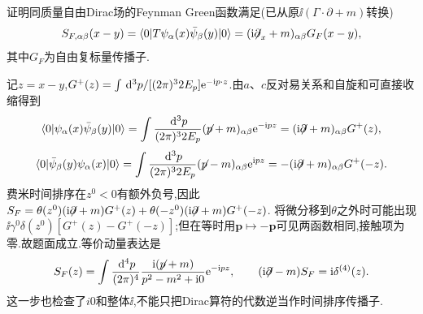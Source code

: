 \begin{exercise}
证明同质量自由Dirac场的Feynman Green函数满足(已从原$\ii(\Gamma\cdot\partial+m)$转换)
\[
 S_{F,\alpha\beta}(x-y)=\langle 0\rvert T\psi_\alpha(x)\bar\psi_\beta(y)\lvert 0\rangle
 =(\mathrm i\mathord{\not\mathrel{\partial}}_x+m)_{\alpha\beta}G_F(x-y),
\]
其中$G_F$为自由复标量传播子.
\end{exercise}
\begin{solution}
记$z=x-y$,$G^+(z)=\int\,\mathrm d^3p/[(2\pi)^3 2E_p]\mathrm e^{-\mathrm i p\cdot z}$.由$a$、$c$反对易关系和自旋和可直接收缩得到
\[
 \langle 0\rvert\psi_\alpha(x)\bar\psi_\beta(y)\lvert 0\rangle
 =\int\frac{\,\mathrm d^3p}{(2\pi)^3 2E_p}(\mathord{\not\mathrel{p}}+m)_{\alpha\beta}\mathrm e^{-\mathrm i pz}
 =(\mathrm i\mathord{\not\mathrel{\partial}}+m)_{\alpha\beta}G^+(z),
\]
\[
 \langle 0\rvert\bar\psi_\beta(y)\psi_\alpha(x)\lvert 0\rangle
 =\int\frac{\,\mathrm d^3p}{(2\pi)^3 2E_p}(\mathord{\not\mathrel{p}}-m)_{\alpha\beta}\mathrm e^{\mathrm i pz}
 =-(\mathrm i\mathord{\not\mathrel{\partial}}+m)_{\alpha\beta}G^+(-z).
\]
费米时间排序在$z^0<0$有额外负号,因此
$S_F=\theta(z^0)(\mathrm i\mathord{\not\mathrel{\partial}}+m)G^+(z)+\theta(-z^0)(\mathrm i\mathord{\not\mathrel{\partial}}+m)G^+(-z)$.
将微分移到$\theta$之外时可能出现
$\ii\gamma^0\delta(z^0)[G^+(z)-G^+(-z)]$;但在等时用$\mathbf p\mapsto-\mathbf p$可见两函数相同,接触项为零.故题面成立.等价动量表达是
\[
 S_F(z)=\int\frac{\,\mathrm d^4p}{(2\pi)^4}\frac{\mathrm i(\mathord{\not\mathrel{p}}+m)}{p^2-m^2+\mathrm i0}\mathrm e^{-\mathrm i pz},
 \qquad(\mathrm i\mathord{\not\mathrel{\partial}}-m)S_F=\mathrm i\delta^{(4)}(z).
\]
这一步也检查了$i0$和整体$\ii$,不能只把Dirac算符的代数逆当作时间排序传播子.
\end{solution}

